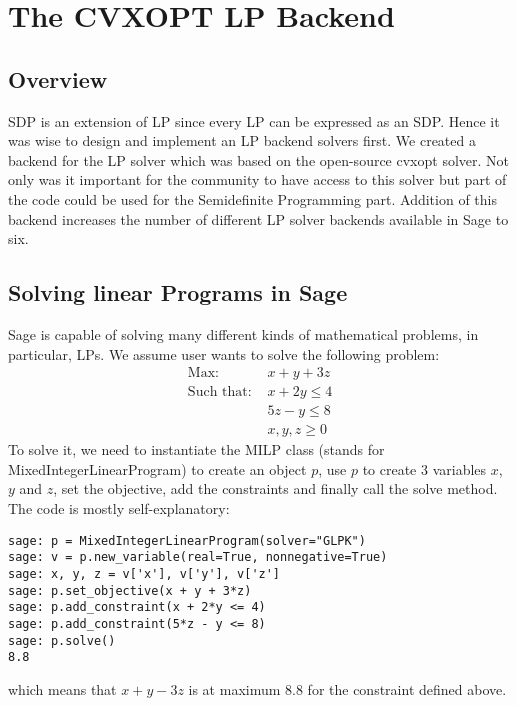 
\chapter{The CVXOPT LP Backend} %

\label{Chapter2} %



\section{Overview}
SDP is an extension of LP since every LP can be expressed as an SDP. Hence it was wise to design and implement an LP backend solvers first. We created a backend for the LP solver which was based on the open-source cvxopt solver. Not only was it important for the community to have access to this solver but part of the code could be used for the Semidefinite Programming part. Addition of this backend increases the number of different LP solver backends available in Sage to six.

\section{Solving linear Programs in Sage}
\label{solvelp}
Sage is capable of solving many different kinds of mathematical problems, in particular, LPs. We assume user wants to solve the following problem:
\begin{align}
\text{Max: } & x + y + 3z\\
\text{Such that: } & x + 2y \leq 4\\
\text{} & 5z - y \leq 8\\
\text{} & x,y,z \geq 0
\end{align}
To solve it, we need to instantiate the MILP class (stands for MixedIntegerLinearProgram) to create an object $p$, use $p$ to create 3 variables $x$, $y$ and $z$, set the objective, add the constraints and finally call the solve method. The code is mostly self-explanatory:

\begin{verbatim}
sage: p = MixedIntegerLinearProgram(solver="GLPK")
sage: v = p.new_variable(real=True, nonnegative=True)
sage: x, y, z = v['x'], v['y'], v['z']
sage: p.set_objective(x + y + 3*z)
sage: p.add_constraint(x + 2*y <= 4)
sage: p.add_constraint(5*z - y <= 8)
sage: p.solve()
8.8
\end{verbatim}
which means that $x + y -3z$ is at maximum 8.8 for the constraint defined above. 

